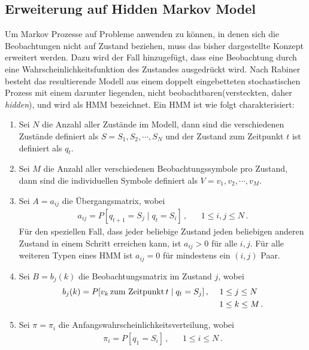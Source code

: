 \subsection{Erweiterung auf Hidden Markov Model}
\label{subsec:HMM}
Um Markov Prozesse auf Probleme anwenden zu k\"onnen, in denen sich die Beobachtungen nicht auf Zustand beziehen, muss das bisher dargestellte Konzept erweitert werden. Dazu wird der Fall hinzugef\"ugt, dass eine Beobachtung durch eine Wahrscheinlichkeitsfunktion des Zustandes ausgedr\"uckt wird. Nach Rabiner~\cite{bib:hmmrabiner} besteht das resultierende Modell aus einem doppelt eingebetteten stochastischen Prozess mit einem darunter liegenden, nicht beobachtbaren(versteckten, daher \textit{hidden}),  und wird als \gls{HMM} bezeichnet.
\newline
Ein \acrshort{HMM} ist wie folgt charakterisiert:
\begin{enumerate}
\item Sei $N$ die Anzahl aller Zust\"ande im Modell, dann sind die verschiedenen Zust\"ande definiert als $S = {S_1, S_2, \cdots, S_N}$ und der Zustand zum Zeitpunkt $t$ ist definiert als $q_t$.
\item Sei $M$ die Anzahl aller verschiedenen Beobachtungssymbole pro Zustand, dann sind die individuellen Symbole definiert als $V = {v_1, v_2, \cdots, v_M}$.
\item Sei $A = {a_{ij}}$ die \"Ubergangsmatrix, wobei
\begin{align}
a_{ij} = P[q_{t+1} = S_j \mid q_t = S_i] \, , & & 1 \leq i, j \leq N \, .
\end{align}
F\"ur den speziellen Fall, dass jeder beliebige Zustand jeden beliebigen anderen Zustand in einem Schritt erreichen kann, ist $a_{ij} > 0$ f\"ur alle $i, j$. F\"ur alle weiteren Typen eines \acrshort{HMM} ist $a_{ij} = 0$ f\"ur mindestens ein $(i, j)$ Paar.
\item Sei $B = {b_j(k)}$ die Beobachtungsmatrix im Zustand $j$, wobei
\begin{align}
b_j(k) = P[v_k \,\mbox{zum Zeitpunkt} \, t \mid q_t = S_j]\, , & & 1 \leq j \leq N \, \, \, \,  \notag \\
& & \, \, 1 \leq k \leq M \, .
\end{align}
\item Sei $\pi = {\pi_i}$ die Anfangswahrscheinlichkeitsverteilung, wobei
\begin{align}
\pi_i = P [q_1 = S_i] \, , & & 1 \leq i \leq N \, .
\end{align}
\end{enumerate}

